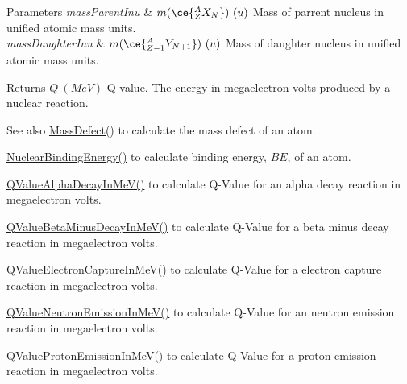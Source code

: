\begin{DoxyParams}{Parameters}
{\em mass\+Parent\+Inu} & $m(\ce{ ^{A}_{Z}X_{N} })\ (u)$ Mass of parrent nucleus in unified atomic mass units. \\
\hline
{\em mass\+Daughter\+Inu} & $m(\ce{ ^{A}_{Z -1}Y_{N +1} })\ (u)$ Mass of daughter nucleus in unified atomic mass units. \\
\hline
\end{DoxyParams}
\begin{DoxyReturn}{Returns}
$Q\ (MeV)$ Q-\/value. The energy in megaelectron volts produced by a nuclear reaction. 
\end{DoxyReturn}
\begin{DoxySeeAlso}{See also}
\mbox{\hyperlink{group___e_g_x_phys-_mass_defect_gae89f2dfa65992c0314adc2440b2f582a}{Mass\+Defect()}} to calculate the mass defect of an atom. 

\mbox{\hyperlink{group___e_g_x_phys-_nuclear_binding_energy_gab6832bf15ead7b4e867e759e0a2a078e}{Nuclear\+Binding\+Energy()}} to calculate binding energy, $BE$, of an atom. 

\mbox{\hyperlink{group___e_g_x_phys-_q_value-_alpha_ga4f9a38d3ad4bf93471a0affb493b6e72}{Q\+Value\+Alpha\+Decay\+In\+Me\+V()}} to calculate Q-\/\+Value for an alpha decay reaction in megaelectron volts. 

\mbox{\hyperlink{group___e_g_x_phys-_q_value-_beta_minus_gaac1374ce9ba39bef416f34298708bda9}{Q\+Value\+Beta\+Minus\+Decay\+In\+Me\+V()}} to calculate Q-\/\+Value for a beta minus decay reaction in megaelectron volts. 

\mbox{\hyperlink{group___e_g_x_phys-_q_value-_electron_capture_ga9cd8502b6101614c17114e9710cdcf6c}{Q\+Value\+Electron\+Capture\+In\+Me\+V()}} to calculate Q-\/\+Value for a electron capture reaction in megaelectron volts. 

\mbox{\hyperlink{group___e_g_x_phys-_q_value-_neutron_emission_ga8ad6e53cb04260eb9b140e22b5b6d9f6}{Q\+Value\+Neutron\+Emission\+In\+Me\+V()}} to calculate Q-\/\+Value for an neutron emission reaction in megaelectron volts. 

\mbox{\hyperlink{group___e_g_x_phys-_q_value-_proton_emission_ga5d92756e945e66bd2ed7d55145b95c3b}{Q\+Value\+Proton\+Emission\+In\+Me\+V()}} to calculate Q-\/\+Value for a proton emission reaction in megaelectron volts. 
\end{DoxySeeAlso}
\mbox{\label{group___e_g_x_phys-_q_value-_beta_plus_ga3531ffda0c561a601a61f54f5c7780df}} 
